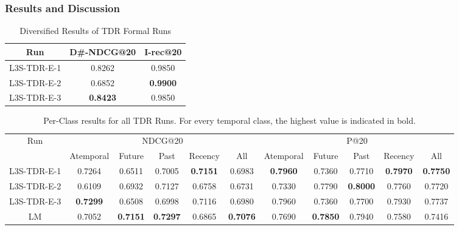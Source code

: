 \documentclass{sig-alternate}
\begin{document}
\subsubsection{Results and Discussion}
\label{results}
\begin{table}[htb]
\centering
\begin{tabular}{|c|c|c|}
\hline
Run & D\#-NDCG@20 & I-rec@20 \\
\hline
\hline
L3S-TDR-E-1 & 0.8262 & 0.9850 \\
\hline
L3S-TDR-E-2 & 0.6852 & \textbf{0.9900} \\
\hline
L3S-TDR-E-3 & \textbf{0.8423} & 0.9850 \\
\hline
\end{tabular}  
\caption{Diversified Results of TDR Formal Runs}
\label{table:3}
\end{table}
\begin{table*}[htb]
\begin{tabular}{ |c|c|c|c|c|c|c|c|c|c|c| }
 \hline
  \multirow{2}{*}{Run} & \multicolumn{5}{|c|}{NDCG@20} & \multicolumn{5}{|c|}{P@20}\\
  	\hhline{~----------}
    & Atemporal & Future & Past & Recency & All & Atemporal & Future & Past & Recency & All \\
    \hline
 \hline
 L3S-TDR-E-1 & 0.7264 & 0.6511 & 0.7005 & \textbf{0.7151} & 0.6983 & \textbf{0.7960} & 0.7360 & 0.7710 & \textbf{0.7970} & \textbf{0.7750}\\ 
 \hline
 L3S-TDR-E-2 & 0.6109 & 0.6932 & 0.7127 & 0.6758 & 0.6731 & 0.7330 & 0.7790 & \textbf{0.8000} & 0.7760 & 0.7720\\ 
 \hline
 L3S-TDR-E-3 & \textbf{0.7299} & 0.6508 & 0.6998 & 0.7116 & 0.6980 & 0.7960 & 0.7360 & 0.7700 & 0.7930 & 0.7737\\ 
 \hline
 LM & 0.7052 & \textbf{0.7151} & \textbf{0.7297} & 0.6865 & \textbf{0.7076} & 0.7690 & \textbf{0.7850} & 0.7940 & 0.7580 & 0.7416\\ 
 \hline
\end{tabular}
\caption{Per-Class results for all TDR Runs. For every temporal class, the highest value is indicated in bold.}
\label{table:2}
\end{table*}
\end{document}
